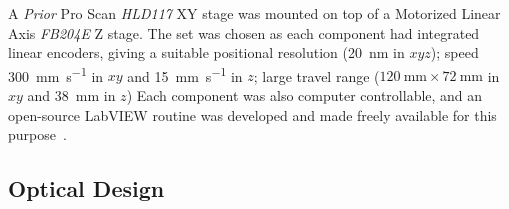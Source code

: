 A \emph{Prior} Pro Scan \textit{HLD117} XY stage was mounted on top of a Motorized Linear Axis \textit{FB204E} Z stage.
The set was chosen as each component had integrated linear encoders, giving a suitable positional resolution (\SI{20}{\nano\meter} in \(xyz\));
speed \SI{300}{\milli\meter\per\second} in \(xy\) and \SI{15}{\milli\meter\per\second} in \(z\);
large travel range (\(\SI{120}{\milli\meter} \times \SI{72}{\milli\meter} \) in \(xy\) and \SI{38}{\milli\meter} in \(z\))%
Each component was also computer controllable, and an open-source \gls{LabVIEW} routine was developed and made freely available for this purpose~\cite{russellSpimcontroller2017}.
%
%
\subsection{Optical Design}

